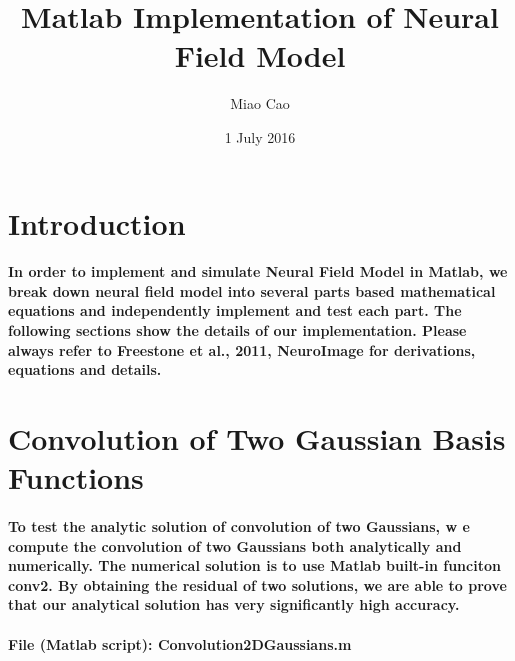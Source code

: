 \documentclass[a4paper, 12pt, english]{article}
\title{Matlab Implementation of Neural Field Model}
\author{Miao Cao}
\date{1 July 2016}
\begin{document}
\onehalfspacing

\begin{titlepage}\centering
\vspace*{\fill}
\maketitle
\vspace*{\fill}
\end{titlepage}

\tableofcontents

\newpage



\section{Introduction}
\paragraph{In order to implement and simulate Neural Field Model in Matlab, we break down
neural field model into several parts based mathematical equations and independently implement and test each part. The
following sections show the details of our implementation. Please always refer to
Freestone et al., 2011, NeuroImage for derivations, equations and details.}

\newpage



\section{Convolution of Two Gaussian Basis Functions}

\paragraph{To test the analytic solution of convolution of two Gaussians, w
e compute the convolution of two Gaussians both analytically and numerically.
The numerical solution is to use Matlab built-in funciton conv2. By obtaining
the residual of two solutions, we are able to prove that our analytical solution
has very significantly high accuracy.}

\paragraph{File (Matlab script): Convolution2DGaussians.m}
\end{document}
